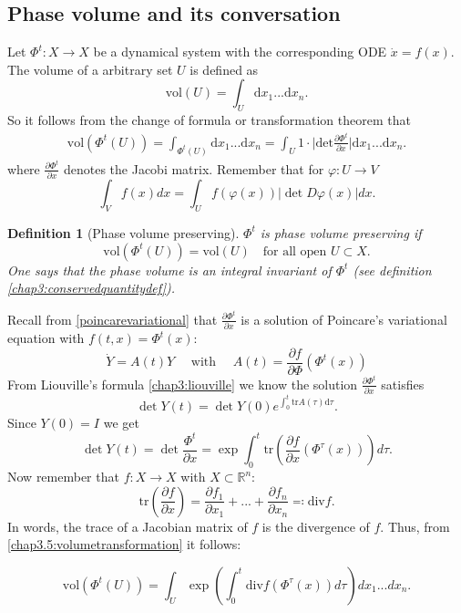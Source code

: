\documentclass[hidelinks,a4paper, 11pt]{article}
\theoremstyle{plain}
\theoremstyle{break}
\theoremstyle{plain}
\newtheorem{definition}[theorem]{Definition}
\theoremstyle{definition}
\begin{document}
\subsection{Phase volume and its conversation}
Let $\Phi^t: X \to X$ be a dynamical system with the corresponding ODE $\dot x = f(x)$. The volume of a arbitrary set $U$ is defined as
\[
	\mathrm{vol}(U) = \int_U \mathrm dx_1 ... \mathrm dx_n.
\]
So it follows from the change of formula or transformation theorem that
\begin{align} \label{chap3.5:volumetransformation}
	\mathrm{vol}(\Phi^t(U)) = \int_{\Phi^t(U)}\mathrm dx_1... \mathrm dx_n = \int_U 1 \cdot \Big \vert \mathrm{det} \frac{\partial \Phi^t}{\partial x} \Big \vert \mathrm dx_1 ... \mathrm dx_n.
\end{align}
where $\frac{\partial \Phi^t}{\partial x}$ denotes the Jacobi matrix. Remember that for $\varphi: U \to V$
\[
	 \int_V f(x)dx = \int_U f(\varphi(x))\vert \det D\varphi(x)\vert dx \tag{Transformation formula}.
\]

\begin{definition}[Phase volume preserving]
	$\Phi^t$ is \emph{phase volume preserving} if 
	\[
		\mathrm{vol}(\Phi^t(U))  = \mathrm{vol}(U) \quad \text{for all open $U \subset X$.}
	\]
	One says that the phase volume is an \emph{integral invariant} of $\Phi^t$ (see definition \ref{chap3:conservedquantitydef}).
\end{definition}
\begin{center}
\end{center}


Recall from \eqref{poincarevariational} that $\frac{\partial \Phi^t}{\partial x}$ is a solution of Poincare's variational equation with $f(t,x) = \Phi^t(x)$:
\[
	\dot Y = A(t) Y \quad \text{ with } \quad A(t) = \frac{\partial f}{\partial \Phi}(\Phi^t(x))
\]
From Liouville's formula \eqref{chap3:liouville} we know the solution $\frac{\partial \Phi^t}{\partial x}$ satisfies 
\[
	\det Y(t) = \det Y(0) e^{\int^t_0 \mathrm{tr}A(\tau)\mathrm d \tau}.
\]
Since $Y(0) = I$ we get 
\[
	\det Y(t) = \det \frac{\Phi^t}{\partial x} = \exp \int^t_0 \mathrm{tr} \left( \frac{\partial f}{\partial x}(\Phi^{\tau}(x)) \right) d\tau.
\]
Now remember that $f: X \to X$ with $X \subset \mathbb R^n$:
\[
	\mathrm{tr}\left( \frac{\partial f}{\partial x}\right) = \frac{\partial f_1}{\partial x_1} + ... + \frac{\partial f_n}{\partial x_n} \eqqcolon \mathrm{div}f.
\]
In words, the trace of a Jacobian matrix of $f$ is the divergence of $f$. Thus, from \eqref{chap3.5:volumetransformation} it follows:
\begin{framed}
\[
	\mathrm{vol}(\Phi^t(U)) = \int_U \exp\left(\int_0^t \mathrm{div} f(\Phi^{\tau}(x)) d\tau\right) dx_1...dx_n.
\]
\end{framed}
\end{document}
